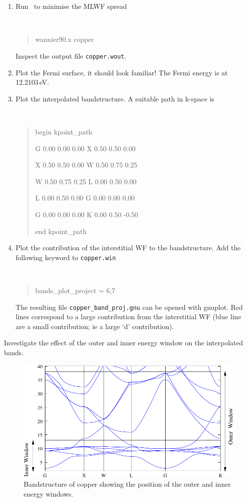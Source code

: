 \documentclass[a4paper,11pt,twoside]{article}
\begin{document}
\begin{enumerate}
\item Run \wannier\ to minimise the MLWF spread
{\tt
\begin{quote}
wannier90.x copper
\end{quote} }
Inspect the output file {\tt copper.wout}. 

\item Plot the Fermi surface, it should look familiar! The Fermi
  energy is at 12.2103\,eV. 

\item Plot the interpolated bandstructure. A suitable path in k-space is
\smallskip
{\tt
\begin{quote}
begin kpoint\_path

G 0.00  0.00  0.00    X 0.50  0.50  0.00

X 0.50  0.50  0.00    W 0.50  0.75  0.25

W 0.50  0.75  0.25    L 0.00  0.50  0.00

L 0.00  0.50  0.00    G 0.00  0.00  0.00

G 0.00  0.00  0.00    K 0.00  0.50 -0.50
 
end kpoint\_path
\end{quote} }
\item Plot the contribution of the interstitial WF to the
  bandstructure. Add the following keyword to {\tt copper.win}
\smallskip
{\tt
\begin{quote}
bands\_plot\_project = 6,7
\end{quote} }
The resulting file {\tt copper\_band\_proj.gnu} can be opened with
gnuplot. Red lines correspond to a large contribution from the
interstitial WF (blue line are a small contribution; ie a large `d' contribution).


\end{enumerate}




Investigate the effect of the outer and inner energy window on the
interpolated bands. 



\begin{figure}[h]
\begin{center}
\includegraphics{cu}
\caption{Bandstructure of copper showing the position of the outer
  and inner energy windows.} 
\label{fig:cu-bnd}
\end{center}
\end{figure}
\end{document}
